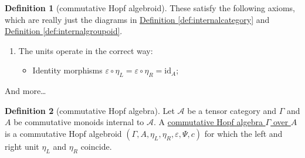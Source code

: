 \documentclass[a4paper]{report}
\newcommand{\defn}[1]{\ul{#1}}
\theoremstyle{definition}
\newtheorem{definition}{Definition}[section]
\theoremstyle{plain}
\theoremstyle{remark}
\begin{document}
\begin{definition}[commutative Hopf algebroid]
  These satisfy the following axioms, which are really just the diagrams in \hyperref[def:internalcategory]{Definition \ref*{def:internalcategory}} and \hyperref[def:internalgroupoid]{Definition \ref*{def:internalgroupoid}}.
  \begin{enumerate}
    \item The units operate in the correct way:
      \begin{itemize}
        \item Identity morphisms $\varepsilon \circ \eta_{L} = \varepsilon \circ \eta_{R} = \mathrm{id}_{A}$;
      \end{itemize}
  \end{enumerate}
  And more\dots
\end{definition}

\begin{definition}[commutative Hopf algebra]
  \label{def:commutativehopfalgebra}
  Let $\mathscr{A}$ be a tensor category and $\Gamma$ and $A$ be commutative monoids internal to $\mathscr{A}$. A \defn{commutative Hopf algebra $\Gamma$ over $A$} is a commutative Hopf algebroid $(\Gamma, A, \eta_{L}, \eta_{R}, \varepsilon, \Psi, c)$ for which the left and right unit $\eta_{L}$ and $\eta_{R}$ coincide.
\end{definition}
\end{document}
